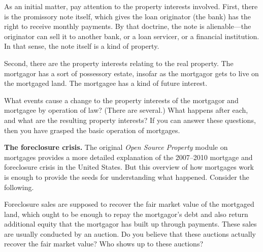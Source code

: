 
\item \label{mortgage-interests} As an initial matter, pay attention to the
property interests involved.
First, there is the promissory note itself, which gives the loan originator (the
bank) has the right to receive monthly payments.
By that doctrine, the note is alienable---the originator can sell it to another
bank, or a loan servicer, or a financial institution. In that sense, the note
itself is a kind of property.


Second, there are the property interests relating to the real property.
The mortgagor has a sort of possessory estate, insofar as the mortgagor gets to
live on the mortgaged land. The mortgagee has a kind of future interest.

What events cause a change to the
property interests of the mortgagor and mortgagee by operation of law? (There
are several.) What happens after each, and what are the resulting property
interests? If you can answer these questions, then you have grasped the basic
operation of mortgages.

\item \textbf{The foreclosure crisis.} The original \emph{Open Source Property}
module on mortgages provides a
more detailed explanation of the 2007--2010 mortgage and foreclosure crisis in
the United States. But this overview of how mortgages work is enough to provide
the seeds for understanding what happened. Consider the following.

\item Foreclosure sales are supposed to recover the fair market value of the
mortgaged land, which ought to be enough to repay the mortgagor's debt and also
return additional equity that the mortgagor has built up through payments. These
sales are usually conducted by an auction. Do you believe that these auctions
actually recover the fair market value? Who shows up to these auctions?

